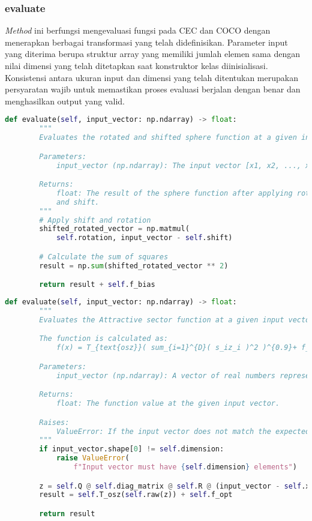\subsubsection{evaluate}
\textit{Method} ini berfungsi mengevaluasi fungsi pada CEC dan COCO dengan menerapkan berbagai transformasi yang telah didefinisikan. Parameter input yang diterima berupa struktur array yang memiliki jumlah elemen sama dengan nilai dimensi yang telah ditetapkan saat konstruktor kelas diinisialisasi. Konsistensi antara ukuran input dan dimensi yang telah ditentukan merupakan persyaratan wajib untuk memastikan proses evaluasi berjalan dengan benar dan menghasilkan output yang valid.
\begin{lstlisting}[language=Python, caption=\textit{method evaluate} fungsi sphere, label=lst:evaluate_cec]
    def evaluate(self, input_vector: np.ndarray) -> float:
        """
        Evaluates the rotated and shifted sphere function at a given input vector.

        Parameters:
            input_vector (np.ndarray): The input vector [x1, x2, ..., xD].

        Returns:
            float: The result of the sphere function after applying rotation
            and shift.
        """
        # Apply shift and rotation
        shifted_rotated_vector = np.matmul(
            self.rotation, input_vector - self.shift)

        # Calculate the sum of squares
        result = np.sum(shifted_rotated_vector ** 2)

        return result + self.f_bias
\end{lstlisting}
\begin{lstlisting}[language=Python, caption=\textit{method evaluate} fungsi Attractive sector, label=lst:evaluate_coco]
    def evaluate(self, input_vector: np.ndarray) -> float:
        """
        Evaluates the Attractive sector function at a given input vector.

        The function is calculated as:
            f(x) = T_{text{osz}}( sum_{i=1}^{D}( s_iz_i )^2 )^{0.9}+ f_opt

        Parameters:
            input_vector (np.ndarray): A vector of real numbers representing a candidate solution. Must have the same length as the dimension of the Attractive sector function.

        Returns:
            float: The function value at the given input vector.

        Raises:
            ValueError: If the input vector does not match the expected dimension.
        """
        if input_vector.shape[0] != self.dimension:
            raise ValueError(
                f"Input vector must have {self.dimension} elements")

        z = self.Q @ self.diag_matrix @ self.R @ (input_vector - self.x_opt)
        result = self.T_osz(self.raw(z)) + self.f_opt

        return result
\end{lstlisting}
